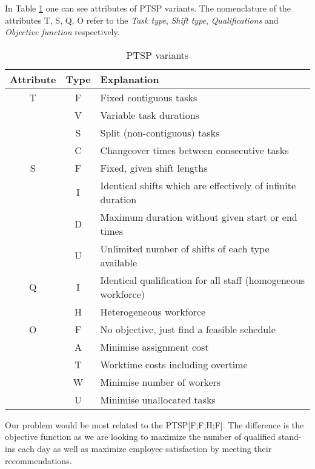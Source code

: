 In Table \ref{PTSP} one can see attributes of PTSP variants. The nomenclature of the attributes T, S, Q, O refer to the \textit{Task type}, \textit{Shift type}, \textit{Qualifications} and \textit{Objective function} respectively. 
\begin{table}[!h]
\caption{PTSP variants}
\label{PTSP}
\begin{tabular}{|c|c|l|}
\hline
\textbf{Attribute} & \textbf{Type} & \textbf{Explanation} \\ \hline
T & F & Fixed contiguous tasks \\
& V & Variable task durations \\
& S & Split (non-contiguous) tasks \\
& C & Changeover times between consecutive tasks \\
\hline 
S & F & Fixed, given shift lengths \\
& I & Identical shifts which are effectively of infinite duration \\
& D & Maximum duration without given start or end times \\
& U & Unlimited number of shifts of each type available \\
\hline 
Q & I & Identical qualification for all staff (homogeneous workforce) \\
& H & Heterogeneous workforce \\
\hline 
O & F & No objective, just find a feasible schedule \\
& A & Minimise assignment cost \\
& T & Worktime costs including overtime \\
& W & Minimise number of workers \\
& U & Minimise unallocated tasks \\
\hline  

\end{tabular}
\end{table}

Our problem would be most related to the PTSP[F;F;H;F]. The difference is the objective function as we are looking to maximize the number of qualified stand-ins each day as well as maximize employee satisfaction by meeting their recommendations. 

